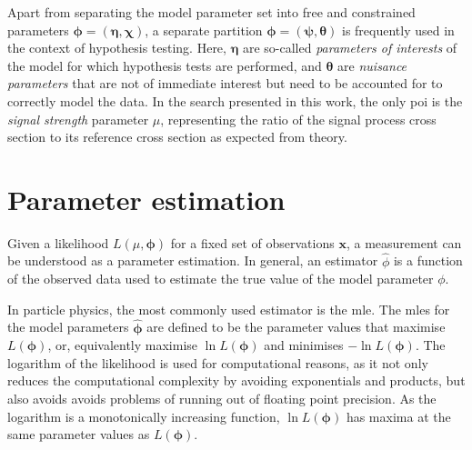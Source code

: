 Apart from separating the model parameter set into free and constrained parameters $\boldsymbol{\phi} = (\boldsymbol{\eta},\boldsymbol{\chi})$, a separate partition $\boldsymbol{\phi} = (\boldsymbol{\psi},\boldsymbol{\theta})$ is frequently used in the context of hypothesis testing. Here, $\boldsymbol{\eta}$ are so-called \textit{parameters of interests} of the model for which hypothesis tests are performed, and $\boldsymbol{\theta}$ are \textit{nuisance parameters} that are not of immediate interest but need to be accounted for to correctly model the data. In the search presented in this work, the only \gls{poi} is the \textit{signal strength} parameter $\mu$, representing the ratio of the signal process cross section to its reference cross section as expected from theory.

  

\section{Parameter estimation}

Given a likelihood $L(\mu,\boldsymbol{\phi})$ for a fixed set of observations $\boldsymbol{x}$, a measurement can be understood as a parameter estimation. In general, an estimator $\hat{\phi}$ is a function of the observed data used to estimate the true value of the model parameter $\phi$.

In particle physics, the most commonly used estimator is the \gls{mle}. The \glspl{mle} for the model parameters $\boldsymbol{\hat{\phi}}$ are defined to be the parameter values that maximise $L(\boldsymbol{\phi})$, or, equivalently maximise $\ln{L(\boldsymbol{\phi})}$ and minimises $-\ln{L(\boldsymbol{\phi})}$. The logarithm of the likelihood is used for computational reasons, as it not only reduces the computational complexity by avoiding exponentials and products, but also avoids avoids problems of running out of floating point precision. As the logarithm is a monotonically increasing function, $\ln{L(\boldsymbol{\phi})}$ has maxima at the same parameter values as ${L(\boldsymbol{\phi})}$.

